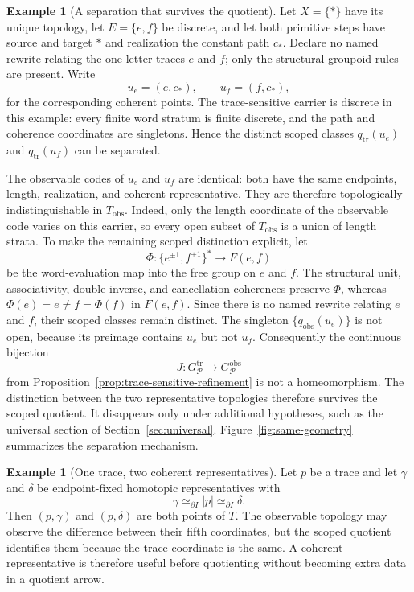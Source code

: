 \documentclass[10pt,reqno]{amsart}
\theoremstyle{definition}
\newtheorem{example}[definition]{Example}
\theoremstyle{plain}
\theoremstyle{remark}
\begin{document}
\begin{example}[A separation that survives the quotient]
\label{ex:quotient-topology-separation}
Let $X=\{*\}$ have its unique topology, let
$E=\{e,f\}$ be discrete, and let both primitive steps have source and target
$*$ and realization the constant path $c_*$.  Declare no named rewrite
relating the one-letter traces $e$ and $f$; only the structural groupoid rules
are present.  Write
\[
  u_e=(e,c_*),\qquad u_f=(f,c_*),
\]
for the corresponding coherent points.  The trace-sensitive carrier is
discrete in this example: every finite word stratum is finite discrete, and
the path and coherence coordinates are singletons.  Hence the distinct
scoped classes $q_{\mathrm{tr}}(u_e)$ and $q_{\mathrm{tr}}(u_f)$ can be
separated.

The observable codes of $u_e$ and $u_f$ are identical: both have the same
endpoints, length, realization, and coherent representative.  They are
therefore topologically indistinguishable in $T_{\mathrm{obs}}$.  Indeed, only
the length coordinate of the observable code varies on this carrier, so every
open subset of $T_{\mathrm{obs}}$ is a union of length strata.  To make the
remaining scoped distinction explicit, let
\[
  \Phi:\{e^{\pm1},f^{\pm1}\}^{*}\longrightarrow F(e,f)
\]
be the word-evaluation map into the free group on $e$ and $f$.  The structural
unit, associativity, double-inverse, and cancellation coherences preserve
$\Phi$, whereas $\Phi(e)=e\neq f=\Phi(f)$ in $F(e,f)$.  Since there is no
named rewrite relating $e$ and $f$, their scoped classes remain distinct.  The
singleton $\{q_{\mathrm{obs}}(u_e)\}$ is not open, because its preimage
contains $u_e$ but not $u_f$.  Consequently the
continuous bijection
\[
  J:G_{\mathcal P}^{\mathrm{tr}}\longrightarrow
    G_{\mathcal P}^{\mathrm{obs}}
\]
from Proposition~\ref{prop:trace-sensitive-refinement} is not a
homeomorphism.  The distinction between the two representative topologies
therefore survives the scoped quotient.  It disappears only under additional
hypotheses, such as the universal section of Section~\ref{sec:universal}.
Figure~\ref{fig:same-geometry} summarizes the separation mechanism.
\end{example}



\begin{example}[One trace, two coherent representatives]
Let $p$ be a trace and let $\gamma$ and $\delta$ be endpoint-fixed homotopic
representatives with
\[
  \gamma\simeq_{\partial I}|p|\simeq_{\partial I}\delta.
\]
Then $(p,\gamma)$ and $(p,\delta)$ are both points of $T$.  The observable
topology may observe the difference between their fifth coordinates, but the
scoped quotient identifies them because the trace coordinate is the same.
A coherent representative is therefore useful before quotienting without
becoming extra data in a quotient arrow.
\end{example}
\end{document}
